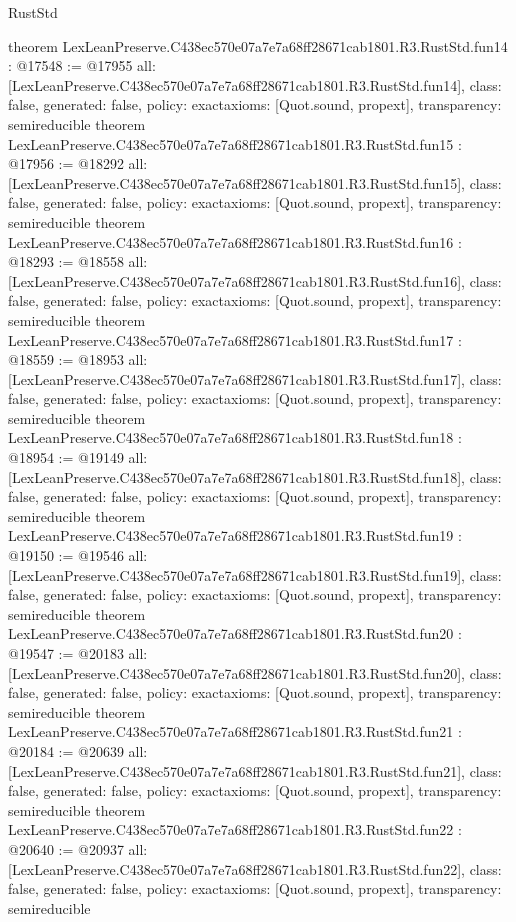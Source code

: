 \begin{lexlean}{RustStd}
\begin{coremodule}
{}
theorem LexLeanPreserve.C438ec570e07a7e7a68ff28671cab1801.R3.RustStd.fun14 : @17548 := @17955 {
  all: [LexLeanPreserve.C438ec570e07a7e7a68ff28671cab1801.R3.RustStd.fun14],
  class: false,
  generated: false,
  policy: exact{axioms: [Quot.sound, propext]},
  transparency: semireducible
}
theorem LexLeanPreserve.C438ec570e07a7e7a68ff28671cab1801.R3.RustStd.fun15 : @17956 := @18292 {
  all: [LexLeanPreserve.C438ec570e07a7e7a68ff28671cab1801.R3.RustStd.fun15],
  class: false,
  generated: false,
  policy: exact{axioms: [Quot.sound, propext]},
  transparency: semireducible
}
theorem LexLeanPreserve.C438ec570e07a7e7a68ff28671cab1801.R3.RustStd.fun16 : @18293 := @18558 {
  all: [LexLeanPreserve.C438ec570e07a7e7a68ff28671cab1801.R3.RustStd.fun16],
  class: false,
  generated: false,
  policy: exact{axioms: [Quot.sound, propext]},
  transparency: semireducible
}
theorem LexLeanPreserve.C438ec570e07a7e7a68ff28671cab1801.R3.RustStd.fun17 : @18559 := @18953 {
  all: [LexLeanPreserve.C438ec570e07a7e7a68ff28671cab1801.R3.RustStd.fun17],
  class: false,
  generated: false,
  policy: exact{axioms: [Quot.sound, propext]},
  transparency: semireducible
}
theorem LexLeanPreserve.C438ec570e07a7e7a68ff28671cab1801.R3.RustStd.fun18 : @18954 := @19149 {
  all: [LexLeanPreserve.C438ec570e07a7e7a68ff28671cab1801.R3.RustStd.fun18],
  class: false,
  generated: false,
  policy: exact{axioms: [Quot.sound, propext]},
  transparency: semireducible
}
theorem LexLeanPreserve.C438ec570e07a7e7a68ff28671cab1801.R3.RustStd.fun19 : @19150 := @19546 {
  all: [LexLeanPreserve.C438ec570e07a7e7a68ff28671cab1801.R3.RustStd.fun19],
  class: false,
  generated: false,
  policy: exact{axioms: [Quot.sound, propext]},
  transparency: semireducible
}
theorem LexLeanPreserve.C438ec570e07a7e7a68ff28671cab1801.R3.RustStd.fun20 : @19547 := @20183 {
  all: [LexLeanPreserve.C438ec570e07a7e7a68ff28671cab1801.R3.RustStd.fun20],
  class: false,
  generated: false,
  policy: exact{axioms: [Quot.sound, propext]},
  transparency: semireducible
}
theorem LexLeanPreserve.C438ec570e07a7e7a68ff28671cab1801.R3.RustStd.fun21 : @20184 := @20639 {
  all: [LexLeanPreserve.C438ec570e07a7e7a68ff28671cab1801.R3.RustStd.fun21],
  class: false,
  generated: false,
  policy: exact{axioms: [Quot.sound, propext]},
  transparency: semireducible
}
theorem LexLeanPreserve.C438ec570e07a7e7a68ff28671cab1801.R3.RustStd.fun22 : @20640 := @20937 {
  all: [LexLeanPreserve.C438ec570e07a7e7a68ff28671cab1801.R3.RustStd.fun22],
  class: false,
  generated: false,
  policy: exact{axioms: [Quot.sound, propext]},
  transparency: semireducible
}
\end{coremodule}
\end{lexlean}
